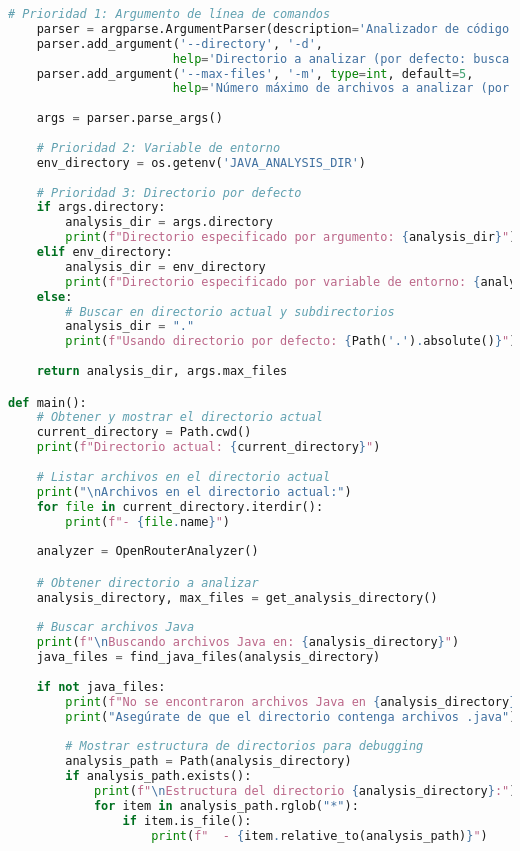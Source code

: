 \begin{lstlisting}[language=python, caption={Contenido completo del script ai\_analyzer.py.}, label={lst:python_script}]
    # Prioridad 1: Argumento de línea de comandos
    parser = argparse.ArgumentParser(description='Analizador de código Java con IA')
    parser.add_argument('--directory', '-d', 
                       help='Directorio a analizar (por defecto: busca en directorio actual)')
    parser.add_argument('--max-files', '-m', type=int, default=5,
                       help='Número máximo de archivos a analizar (por defecto: 5)')
    
    args = parser.parse_args()
    
    # Prioridad 2: Variable de entorno
    env_directory = os.getenv('JAVA_ANALYSIS_DIR')
    
    # Prioridad 3: Directorio por defecto
    if args.directory:
        analysis_dir = args.directory
        print(f"Directorio especificado por argumento: {analysis_dir}")
    elif env_directory:
        analysis_dir = env_directory
        print(f"Directorio especificado por variable de entorno: {analysis_dir}")
    else:
        # Buscar en directorio actual y subdirectorios
        analysis_dir = "."
        print(f"Usando directorio por defecto: {Path('.').absolute()}")
    
    return analysis_dir, args.max_files

def main():
    # Obtener y mostrar el directorio actual
    current_directory = Path.cwd()
    print(f"Directorio actual: {current_directory}")
    
    # Listar archivos en el directorio actual
    print("\nArchivos en el directorio actual:")
    for file in current_directory.iterdir():
        print(f"- {file.name}")
    
    analyzer = OpenRouterAnalyzer()

    # Obtener directorio a analizar
    analysis_directory, max_files = get_analysis_directory()
    
    # Buscar archivos Java
    print(f"\nBuscando archivos Java en: {analysis_directory}")
    java_files = find_java_files(analysis_directory)
    
    if not java_files:
        print(f"No se encontraron archivos Java en {analysis_directory}")
        print("Asegúrate de que el directorio contenga archivos .java")
        
        # Mostrar estructura de directorios para debugging
        analysis_path = Path(analysis_directory)
        if analysis_path.exists():
            print(f"\nEstructura del directorio {analysis_directory}:")
            for item in analysis_path.rglob("*"):
                if item.is_file():
                    print(f"  - {item.relative_to(analysis_path)}")
        

\end{lstlisting}
